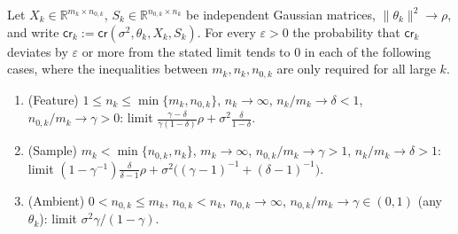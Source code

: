 \begin{theorem}\label{thm:dd:regimeRisks}
  \leanok
Let $X_k\in\mathbb R^{m_k\times n_{0,k}}$, $S_k\in\mathbb R^{n_{0,k}\times n_k}$ be independent Gaussian matrices, $\|\theta_k\|^2\to\rho$, and write $\mathsf{cr}_k:=\mathsf{cr}(\sigma^2,\theta_k,X_k,S_k)$. For every $\varepsilon>0$ the probability that $\mathsf{cr}_k$ deviates by $\varepsilon$ or more from the stated limit tends to $0$ in each of the following cases, where the inequalities between $m_k,n_k,n_{0,k}$ are only required for all large $k$.
\begin{enumerate}
  \item (Feature) $1\le n_k\le\min\{m_k,n_{0,k}\}$, $n_k\to\infty$, $n_k/m_k\to\delta<1$, $n_{0,k}/m_k\to\gamma>0$: limit $\frac{\gamma-\delta}{\gamma(1-\delta)}\rho+\sigma^2\frac\delta{1-\delta}$.
  \item (Sample) $m_k<\min\{n_{0,k},n_k\}$, $m_k\to\infty$, $n_{0,k}/m_k\to\gamma>1$, $n_k/m_k\to\delta>1$: limit $(1-\gamma^{-1})\frac\delta{\delta-1}\rho+\sigma^2\bigl((\gamma-1)^{-1}+(\delta-1)^{-1}\bigr)$.
  \item (Ambient) $0<n_{0,k}\le m_k$, $n_{0,k}<n_k$, $n_{0,k}\to\infty$, $n_{0,k}/m_k\to\gamma\in(0,1)$ (any $\theta_k$): limit $\sigma^2\gamma/(1-\gamma)$.
\end{enumerate}
\end{theorem}

